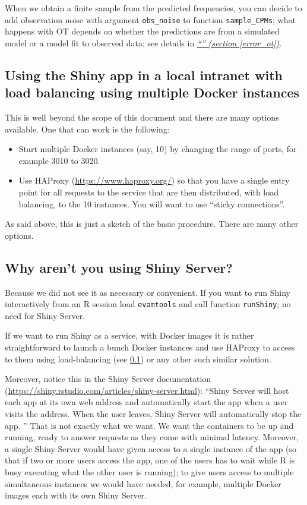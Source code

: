 \documentclass[a4paper,11pt]{article}
\newcommand*{\qref}[1]{\hyperref[{#1}]{\textit{``\nameref*{#1}'' (section \ref*{#1})}}}
\begin{document}
When we obtain a finite sample from the predicted frequencies, you can decide to add observation noise with argument \texttt{obs\_noise} to function \texttt{sample\_CPMs}; what happens with OT depends on whether the predictions are from a simulated model or a model fit to observed data; see details in \qref{error_ot}.


\subsection{Using the Shiny app in a local intranet with load balancing using multiple Docker instances}
\label{haproxy}

This is well beyond the scope of this document and there are many options available. One that can work is the following:
\begin{itemize}
\item Start multiple Docker instances (say, 10) by changing the range of ports, for example 3010 to 3020.
\item Use HAProxy (\url{https://www.haproxy.org/}) so that you have a single entry point for all requests to the service that are then distributed, with load balancing, to the 10 instances. You will want to use ``sticky connections''.
\end{itemize}

As said above, this is just a sketch of the basic procedure. There are many other options.


\subsection{Why aren't you using Shiny Server?}
\label{sec:why-arent-you}

Because we did not see it as necessary or convenient. If you want to run Shiny interactively from an R session load \texttt{evamtools} and call function \texttt{runShiny}; no need for Shiny Server.

If we want to run Shiny as a service, with Docker images it is rather straightforward to launch a bunch Docker instances and use HAProxy to access to them using load-balancing (see \ref{haproxy}) or any other such similar solution.

Moreover, notice this in the Shiny Server documentation (\url{https://shiny.rstudio.com/articles/shiny-server.html}): ``Shiny Server will host each app at its own web address and automatically start the app when a user visits the address. When the user leaves, Shiny Server will automatically stop the app. ''  That is not exactly what we want. We want the containers to be up and running, ready to answer requests as they come with minimal latency. Moreover, a single Shiny Server would have given access to a single instance of the app (so that if two or more users access the app, one of the users has to wait while R is busy executing what the other user is running); to give users access to multiple simultaneous instances we would have needed, for example, multiple Docker images each with its own Shiny Server.
\end{document}
